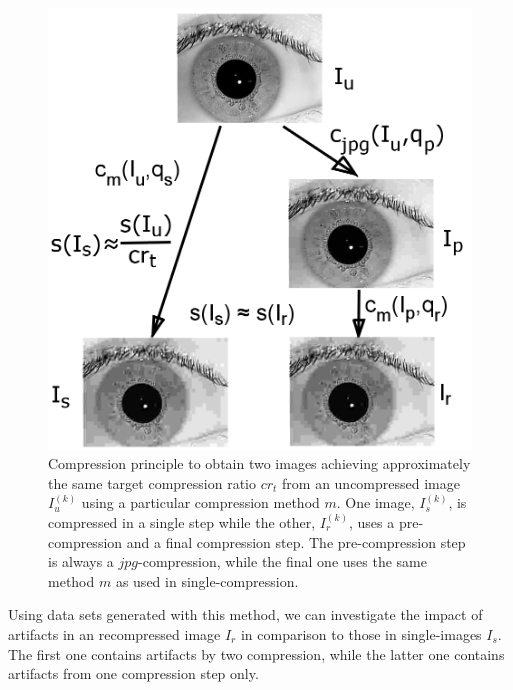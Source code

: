 \documentclass[10pt,twocolumn,letterpaper]{article}
\begin{document}
\begin{figure}
	\begin{center}		
		\includegraphics[width=0.5\linewidth]{img/comprScheme}
	\end{center}
	\caption{Compression principle to obtain two images achieving approximately the same target compression ratio $cr_t$ from an uncompressed image $I_u^{(k)}$ using a particular compression method $m$. One image, $I_s^{(k)}$, is compressed in a single step while the other, $I_r^{(k)}$, uses a pre-compression and a final compression step. The pre-compression step is always a $jpg$-compression, while the final one uses the same method $m$ as used in single-compression.}
	\label{fig:comprScheme}
	
\end{figure}


Using data sets generated with this method, we can investigate the impact of artifacts in an recompressed image $I_r$ in comparison to those in single-images $I_s$. The first one contains artifacts by two compression, while the latter one contains artifacts from one compression step only.
\end{document}
